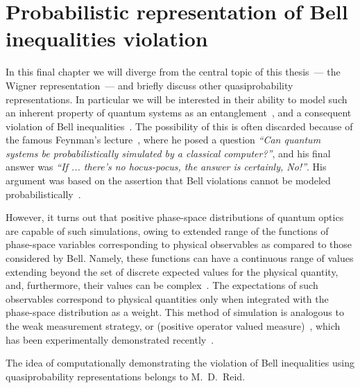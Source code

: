 \chapter{Probabilistic representation of Bell inequalities violation}
\label{cha:bell-ineq}

In this final chapter we will diverge from the central topic of this thesis~--- the Wigner representation~--- and briefly discuss other quasiprobability representations.
In particular we will be interested in their ability to model such an inherent property of quantum systems as an entanglement~\cite{Einstein1935}, and a consequent violation of Bell inequalities~\cite{Bell1964}.
The possibility of this is often discarded because of the famous Feynman's lecture~\cite{Feynman1982}, where he posed a question \textit{``Can quantum systems be probabilistically simulated by a classical computer?''}, and his final answer was \textit{``If ... there's no hocus-pocus, the answer is certainly, No!''}.
His argument was based on the assertion that Bell violations cannot be modeled probabilistically~\cite{Bell1964}.

However, it turns out that positive phase-space distributions of quantum optics~\cite{Husimi1940,Drummond1980,Hillery1984,Gardiner2004} are capable of such simulations, owing to extended range of the functions of phase-space variables corresponding to physical observables as compared to those considered by Bell.
Namely, these functions can have a continuous range of values extending beyond the set of discrete expected values for the physical quantity, and, furthermore, their values can be complex~\cite{Reid1986}.
The expectations of such observables correspond to physical quantities only when integrated with the phase-space distribution as a weight.
This method of simulation is analogous to the weak measurement strategy, or  (positive operator valued measure)~\cite{Aharonov1988}, which has been experimentally demonstrated recently~\cite{Goggin2011}.

The idea of computationally demonstrating the violation of Bell inequalities using quasiprobability representations belongs to M.~D.~Reid.





